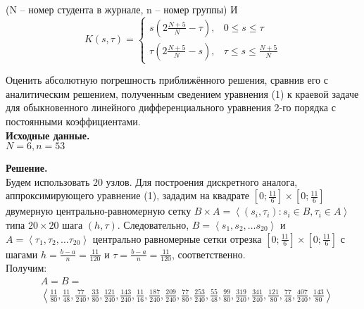 \documentclass[14pt,a4paper]{scrartcl}
\begin{document}
(N -- номер студента в журнале, n -- номер группы)
И
\begin{equation*}
	K(s, \tau)=\left\{\begin{array}{ll}{s\left(2 \frac{N+5}{N}-\tau\right),} & {0 \leq s \leq \tau} \\ {\tau\left(2 \frac{N+5}{N}-s\right),} & {\tau \leq s \leq \frac{N+5}{N}}\end{array}\right.
\end{equation*}

Оценить абсолютную погрешность приближённого решения, сравнив его с аналитическим решением, полученным сведением уравнения (1) к краевой
задаче для обыкновенного линейного дифференциального уравнения 2-го порядка с постоянными коэффициентами.\\

\textbf{Исходные данные.}\\
$N = 6, n = 53$


\textbf{Решение.}\\
Будем использовать 20 узлов. Для построения дискретного аналога, аппроксимирующего уравнение (1), зададим на квадрате $[0; \frac{11}{6}]\times[0;\frac{11}{6}]$ двумерную центрально-равномерную сетку $B \times A=\left\langle\left(s_{i}, \tau_{i}\right): s_{i} \in B, \tau_{i} \in A\right\rangle$ типа $20 \times 20$ шага $(h, \tau)$. Следовательно,  $B =\left\langle s_1, s_2, \ldots s_{20}\right\rangle$ и $A =\left\langle \tau_1, \tau_2, \ldots \tau_{20}\right\rangle$ центрально равномерные сетки отрезка $[0;\frac{11}{6}]\times[0;\frac{11}{6}]$ с шагами $h = \frac{b-a}{n} = \frac{11}{120}$ и $\tau = \frac{b-a}{n} = \frac{11}{120}$, соответственно.\\
Получим:
\begin{align*}
	&A = B = \\
	& \left\langle
	{\frac{11}{80}},
	{\frac{11}{48}},
	{\frac{77}{240}},
	{\frac{33}{80}},
	{\frac{121}{240}},
	{\frac{143}{240}},
	{\frac{11}{16}},
	{\frac{187}{240}},
	{\frac{209}{240}},
	{\frac{77}{80}},
	{\frac{253}{240}},
	{\frac{55}{48}},
	{\frac{99}{80}},
	{\frac{319}{240}},
	{\frac{341}{240}},
	{\frac{121}{80}},
	{\frac{77}{48}},
	{\frac{407}{240}},
	{\frac{143}{80}}\right\rangle
\end{align*}
\end{document}

